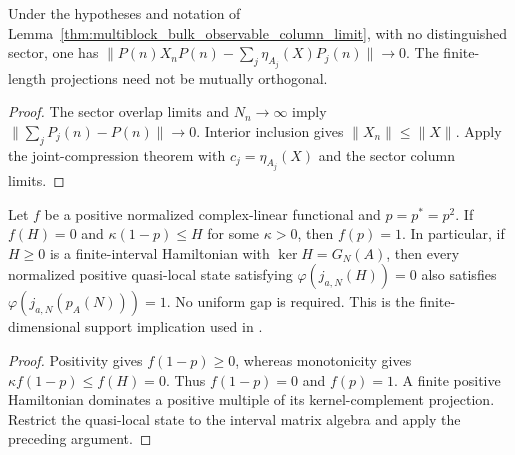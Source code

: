 \begin{lemma}
    \label{thm:multiblock_bulk_observable_sector_decomposition}
    \leanok
    Under the hypotheses and notation of
    Lemma~\ref{thm:multiblock_bulk_observable_column_limit}, with no
    distinguished sector, one has
    $\|P(n)X_nP(n)-\sum_j\eta_{A_j}(X)P_j(n)\|\to0$.
    The finite-length projections need not be mutually orthogonal.
\end{lemma}
\begin{proof}
    \leanok
    The sector overlap limits and $N_n\to\infty$ imply
    $\|\sum_jP_j(n)-P(n)\|\to0$. Interior inclusion gives
    $\|X_n\|\le\|X\|$. Apply the joint-compression theorem with
    $c_j=\eta_{A_j}(X)$ and the sector column limits.
\end{proof}

\begin{lemma}
    \label{thm:positive_functional_zero_energy_support}
    \leanok
    Let $f$ be a positive normalized complex-linear functional and
    $p=p^*=p^2$. If $f(H)=0$ and $\kappa(1-p)\leq H$ for some
    $\kappa>0$, then $f(p)=1$.
    In particular, if $H\geq0$ is a finite-interval Hamiltonian with
    $\ker H=G_N(A)$, then every normalized positive quasi-local state
    satisfying $\varphi(j_{a,N}(H))=0$ also satisfies
    $\varphi(j_{a,N}(p_A(N)))=1$. No uniform gap is required.
    This is the finite-dimensional support implication used in
    \cite[Section~3]{Nachtergaele1996Spectral}.
\end{lemma}
\begin{proof}\leanok
    Positivity gives $f(1-p)\geq0$, whereas monotonicity gives
    $\kappa f(1-p)\leq f(H)=0$. Thus $f(1-p)=0$ and $f(p)=1$.
    A finite positive Hamiltonian dominates a positive multiple of its
    kernel-complement projection. Restrict the quasi-local state to the
    interval matrix algebra and apply the preceding argument.
\end{proof}

